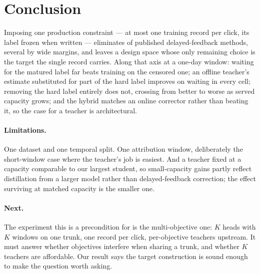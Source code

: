 \section{Conclusion}
\label{sec:conclusion}

Imposing one production constraint --- at most one training record per click, its label frozen
when written --- eliminates \nFail{} of \nScreened{} published delayed-feedback methods, several
by wide margins, and leaves a design space whose only remaining choice is the target the single
record carries. Along that axis at a one-day window: waiting for the matured label far beats
training on the censored one; an offline teacher's estimate substituted for part of the hard
label improves on waiting in every cell; removing the hard label entirely does not, crossing
from better to worse as served capacity grows; and the hybrid matches an online corrector
rather than beating it, so the case for a teacher is architectural.

\paragraph{Limitations.} One dataset and one temporal split. One attribution window,
deliberately the
short-window case where the teacher's job is easiest. And a teacher fixed at a capacity
comparable to our largest student, so small-capacity gains partly reflect distillation from a
larger model rather than delayed-feedback correction; the effect surviving at matched capacity
is the smaller one.

\paragraph{Next.} The experiment this is a precondition for is the multi-objective one: $K$
heads with $K$ windows on one trunk, one record per click, per-objective teachers upstream. It
must answer whether objectives interfere when sharing a trunk, and whether $K$ teachers are
affordable. Our result says the target construction is sound enough to make the question worth
asking.
